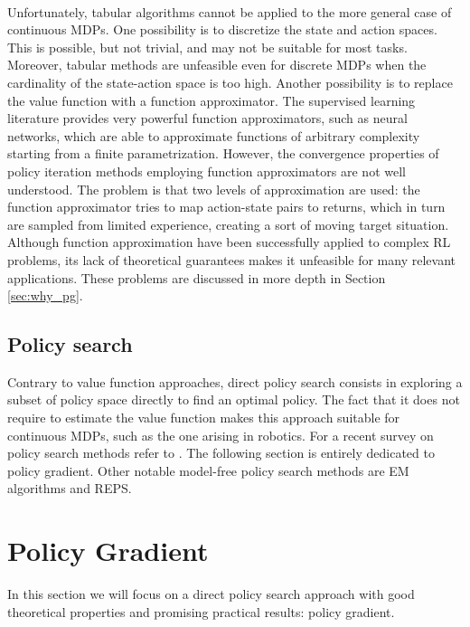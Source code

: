 \paragraph{} %
Unfortunately, tabular algorithms cannot be applied to the more general case of continuous \ac{MDP}s. One possibility is to discretize the state and action spaces. This is possible, but not trivial, and may not be suitable for most tasks. Moreover, tabular methods are unfeasible even for discrete \ac{MDP}s when the cardinality of the state-action space is too high.
Another possibility is to replace the value function with a function approximator. The supervised learning literature provides very powerful function approximators, such as neural networks, which are able to approximate functions of arbitrary complexity starting from a finite parametrization.
However, the convergence properties of policy iteration methods employing function approximators are not well understood. The problem is that two levels of approximation are used: the function approximator tries to map action-state pairs to returns, which in turn are sampled from limited experience, creating a sort of moving target situation. Although function approximation have been successfully applied to complex \ac{RL} problems, its lack of theoretical guarantees makes it unfeasible for many relevant applications. These problems are discussed in more depth in Section \ref{sec:why_pg}.

\subsection{Policy search}
Contrary to value function approaches, direct policy search consists in exploring a subset of policy space directly to find an optimal policy. The fact that it does not require to estimate the value function makes this approach suitable for continuous \ac{MDP}s, such as the one arising in robotics. For a recent survey on policy search methods refer to \cite{deisenroth2013survey}. The following section is entirely dedicated to policy gradient. Other notable model-free policy search methods are \ac{EM} algorithms and \ac{REPS}.

\section{Policy Gradient}\label{sec:pol_grad}
In this section we will focus on a direct policy search approach with good theoretical properties and promising practical results: policy gradient.

